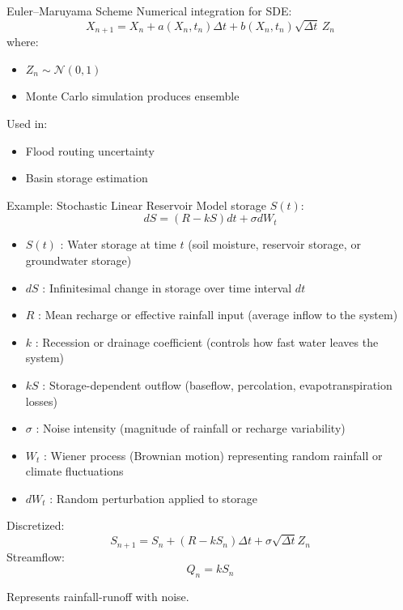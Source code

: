 \documentclass[8pt]{beamer}
\begin{document}
\begin{frame}{Euler--Maruyama Scheme}
Numerical integration for SDE:
\[
X_{n+1} = X_n + a(X_n,t_n)\Delta t + b(X_n,t_n)\sqrt{\Delta t}\,Z_n
\]
where:
\begin{itemize}
 \item $Z_n \sim \mathcal{N}(0,1)$
 \item Monte Carlo simulation produces ensemble
\end{itemize}

Used in:
\begin{itemize}
 \item Flood routing uncertainty
 \item Basin storage estimation
\end{itemize}
\end{frame}

\begin{frame}{Example: Stochastic Linear Reservoir}
Model storage $S(t)$:
\[
dS = (R - kS)dt + \sigma dW_t
\]
\begin{itemize}
    \item $S(t)$ : Water storage at time $t$  
    (soil moisture, reservoir storage, or groundwater storage)

    \item $dS$ : Infinitesimal change in storage over time interval $dt$

    \item $R$ : Mean recharge or effective rainfall input  
    (average inflow to the system)

    \item $k$ : Recession or drainage coefficient  
    (controls how fast water leaves the system)

    \item $kS$ : Storage-dependent outflow  
    (baseflow, percolation, evapotranspiration losses)

    \item $\sigma$ : Noise intensity  
    (magnitude of rainfall or recharge variability)

    \item $W_t$ : Wiener process (Brownian motion)  
    representing random rainfall or climate fluctuations

    \item $dW_t$ : Random perturbation applied to storage
\end{itemize}
Discretized:
\[
S_{n+1} = S_n + (R - kS_n)\Delta t + \sigma \sqrt{\Delta t} Z_n
\]
Streamflow:
\[
Q_n = k S_n
\]

Represents rainfall-runoff with noise.
\end{frame}
\end{document}
